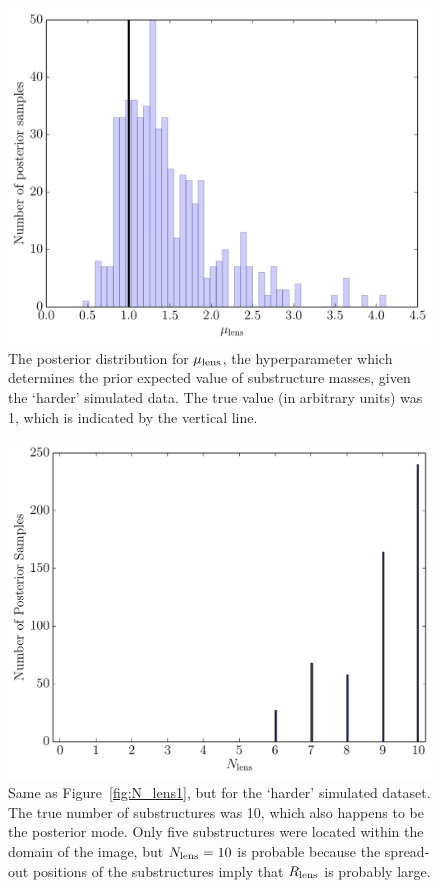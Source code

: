 \documentclass[useAMS,usenatbib]{mn2e}
\newcommand{\revisions}{\color{blue}}
\begin{document}
\begin{figure}
\centering
\includegraphics[scale=0.45]{mu_lens.pdf}
\caption{{\revisions The posterior distribution for $\mu_{\rm lens}$, the
hyperparameter which determines the prior expected value of substructure
masses, given the `harder' simulated data. The true value (in arbitrary units)
was 1, which is indicated by the vertical line.
}
\label{fig:mu_lens}}
\end{figure}


\begin{figure}
\begin{center}
\includegraphics[scale=0.4]{N_lens2.pdf}
\caption{{\revisions
Same as Figure~\ref{fig:N_lens1}, but for the `harder' simulated dataset.
The true number of substructures was 10, which also happens to be the posterior
mode. Only five substructures were located within the domain of the image, but
$N_{\rm lens} = 10$ is probable because the spread-out positions of the
substructures imply that $R_{\rm lens}$ is probably large.
}
\label{fig:N_lens2}}
\end{center}
\end{figure}
\end{document}

